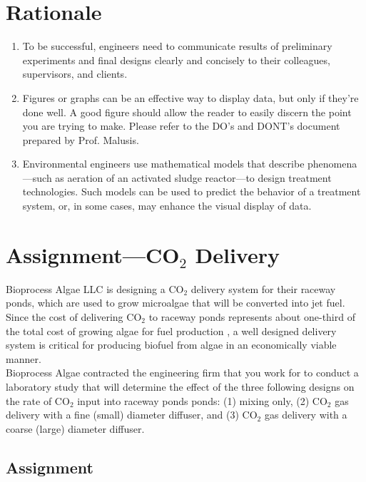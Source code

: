 \documentclass[12pt,letterpaper]{article}
\begin{document}
\section *{Rationale}
\begin{enumerate}
\item To be successful, engineers need to communicate results of preliminary experiments and final designs clearly and concisely to their colleagues, supervisors, and clients.

\item Figures or graphs can be an effective way to display data, but only if they're done well. A good figure should allow the reader to easily discern the point you are trying to make.  Please refer to the DO's and DONT's document prepared by Prof. Malusis.

\item Environmental engineers use mathematical models that describe phenomena---such as aeration of an activated sludge reactor---to design treatment technologies.  Such models can be used to predict the behavior of a treatment system, or, in some cases, may enhance the visual display of data.

\end{enumerate}
 

\section *{Assignment---CO$_2$ Delivery}

Bioprocess Algae LLC is designing a CO$_2$ delivery system for their raceway ponds, which are used to grow microalgae that will be converted into jet fuel. Since the cost of delivering CO$_2$ to raceway ponds represents about one-third of the total cost of growing algae for fuel production \cite{Lund2010}, a well designed delivery system is critical for producing biofuel from algae in an economically viable manner.\\  

Bioprocess Algae contracted the engineering firm that you work for to conduct a laboratory study that will determine the effect of the three following designs  on the rate of CO$_2$ input into raceway ponds ponds: (1) mixing only, (2) CO$_2$ gas delivery with a fine (small) diameter diffuser, and (3) CO$_2$ gas delivery with a coarse (large) diameter diffuser.

\subsection *{Assignment}
\end{document}
